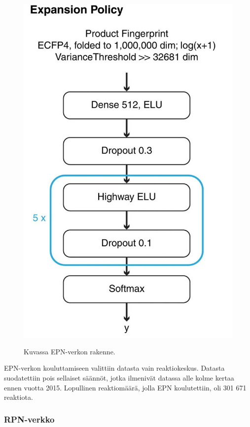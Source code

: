 \documentclass[finnish,twoside,censored,tkt,sw-line]{HYthesisML}
\begin{document}
\begin{figure}[!ht]
    \centering
    \includegraphics[]{expansion-policy.jpg}
    \caption{Kuvassa EPN-verkon rakenne.}
    {\cite{SeglerMarwinHS2018Pcsw}}
    {\label{fig:3n-mcts-epn}}
\end{figure}

EPN-verkon kouluttamiseen valittiin datasta vain reaktiokeskus.
Datasta suodatettiin pois sellaiset säännöt, jotka ilmenivät datassa alle kolme kertaa ennen vuotta 2015.
Lopullinen reaktiomäärä, jolla EPN koulutettiin, oli 301 671 reaktiota.

\subsubsection{RPN-verkko}
\end{document}
